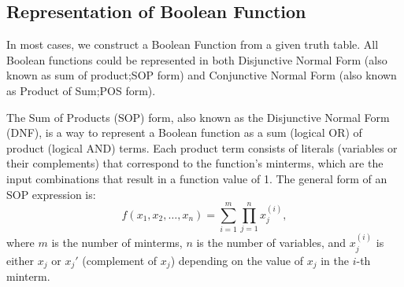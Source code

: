     \subsection{Representation of Boolean Function}
    In most cases, we construct a Boolean Function from a given truth table. All Boolean functions could be represented in both
    Disjunctive Normal Form (also known as sum of product;SOP form) and Conjunctive Normal Form (also known as Product of Sum;POS form).
    \begin{definition}
        The Sum of Products (SOP) form, also known as the Disjunctive Normal Form (DNF), is a way to represent a Boolean function as a sum (logical OR) of product (logical AND) terms. Each product term consists of literals (variables or their complements) that correspond to the function's minterms, which are the input combinations that result in a function value of 1.
        The general form of an SOP expression is:
        \[f(x_1, x_2, \ldots, x_n) = \sum_{i=1}^{m} \prod_{j=1}^{n} x_j^{(i)},\]
        where $m$ is the number of minterms, $n$ is the number of variables, and $x_j^{(i)}$ is either $x_j$ or $x_j'$ (complement of $x_j$) depending on the value of $x_j$ in the $i$-th minterm.
    \end{definition}

